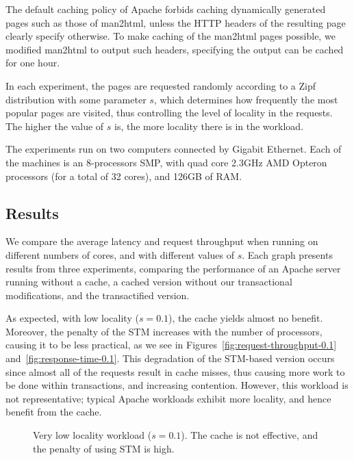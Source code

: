 \documentclass[preprint,11pt]{sigplanconf}
\begin{document}
The default caching policy of Apache forbids caching dynamically generated pages
such as those of man2html, unless the HTTP headers of the resulting page clearly
specify otherwise. To make caching of the man2html pages possible, we modified
man2html to output such headers, specifying the output can be cached for one
hour.

In each experiment, the pages are requested randomly according to a Zipf 
distribution with some parameter $s$, which
determines how frequently the most popular pages are visited,
thus controlling the level of locality in the requests.
The higher the value of $s$ is, the more locality there is in the 
workload.

The experiments run on two computers connected by  Gigabit Ethernet.
Each of the machines is an 8-processors SMP, with quad core 2.3GHz AMD Opteron
processors (for a total of 32 cores), and 126GB of RAM. 

\subsection{Results} 

We compare the average latency and request throughput when running on different
numbers of cores, and with different  values of $s$. Each graph presents 
results from three
experiments, comparing the performance of an Apache server running without a cache, a
cached version without our transactional modifications, and the transactified
version. 

As expected, with low locality ($s=0.1$), the cache yields almost no benefit.
Moreover, the penalty of
the STM increases with the number of processors, causing it to be less
practical, as we see in Figures~\ref{fig:request-throughput-0.1}
and~\ref{fig:response-time-0.1}. This degradation of the STM-based version
occurs since almost all of the requests result in cache
misses, thus causing more work to be done within transactions, 
and increasing contention.  However, this workload is not representative;
typical Apache workloads exhibit more locality, and hence benefit from
the cache.

\begin{figure}
 \centering
 \hfill
 \caption{Very low locality workload ($s = 0.1$). The cache is not effective,
 and the penalty of using STM is high.}
\end{figure}
\end{document}
